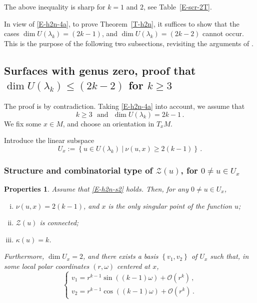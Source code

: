 \documentclass[12pt,a4paper]{amsart}
\theoremstyle{plain} %
\newtheorem{properties}[theorem]{Properties}
\theoremstyle{definition}
\numberwithin{equation}{section}
\numberwithin{figure}{section}
\numberwithin{table}{section}
\newcommand{\cZ}{\mathcal{Z}}
\newcommand{\set}[1]{\left\lbrace #1 \right\rbrace}
\begin{document}
 The above inequality is sharp for $k=1$ and $2$, see Table~\ref{E-scr-2T}. \smallskip

In view of \eqref{E-h2n-4a}, to prove Theorem~\ref{T-h2n}, it suffices to show that the cases $\dim U(\lambda_k) = (2k-1)$, and $\dim U(\lambda_k) = (2k-2)$ cannot occur. This is the purpose of the following two subsections, revisiting the arguments of \cite{HoHN1999}.



\subsection{Surfaces with genus zero, proof that $\dim U(\lambda_k) \le (2k-2)$ for $k\ge 3$}\label{SS-h2n-s2}\phantom{}

The proof is by contradiction. Taking \eqref{E-h2n-4a} into account, we assume that
%
\begin{equation}\label{E-h2n-s2}
k \ge 3 \text{~~and~~} \dim U(\lambda_k) = 2k-1\,.
\end{equation}
%
We fix some $x \in M$, and choose an orientation in $T_xM$.\smallskip

Introduce the linear subspace
%
\begin{equation}\label{E-h2n-s2a}
U_x := \set{u \in U(\lambda_k) ~|~ \nu(u,x) \ge 2(k-1)}\,.
\end{equation}

\subsubsection{Structure and combinatorial type of $\cZ(u)$, for $0 \neq u \in U_x$}\label{SSS-h2n-s2s}

\begin{properties}\label{propertyD2}
Assume that \eqref{E-h2n-s2} holds. Then, for any $0 \not = u \in U_x$,
\begin{enumerate}[(i)]
 \item $\nu(u,x) = 2(k-1)$, and $x$ is the only singular point of the function $u$;
 \item $\cZ(u)$ is connected;
 \item $\kappa(u) = k$.
\end{enumerate}
\noindent Furthermore, $\dim U_x = 2$, and there exists a basis $\set{v_1,v_2}$ of $U_x$ such that, in some local polar coordinates $(r,\omega)$ centered at $x$,
%
\begin{equation}\label{E-h2n-5}
\left\{
\begin{array}{l}
v_1 = r^{k-1} \sin ((k-1)\omega) +\mathcal O (r^k)\,,\\
v_2 = r^{k-1} \cos ((k-1)\omega) +\mathcal O (r^k)\,.
\end{array}
\right.
\end{equation}
%
\end{properties}
\end{document}
